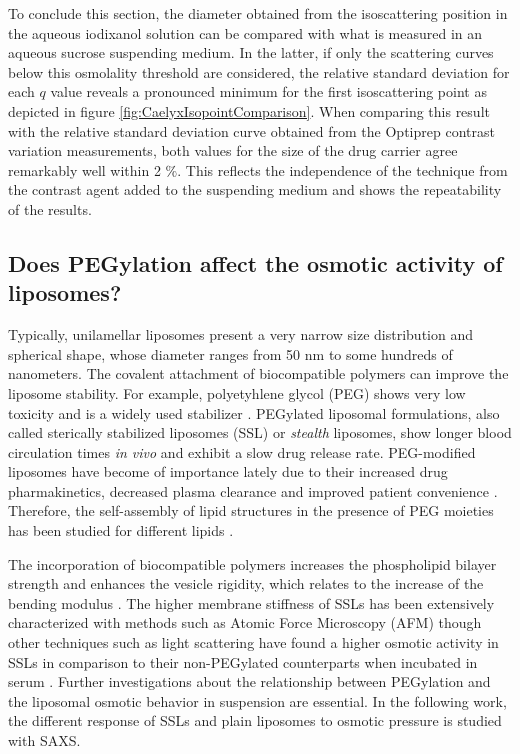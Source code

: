To conclude this section, the diameter obtained from the isoscattering position in the aqueous iodixanol solution can be compared with what is measured in an aqueous sucrose suspending medium. In the latter, if only the scattering curves below this osmolality threshold are considered, the relative standard deviation for each $q$ value reveals a pronounced minimum for the first isoscattering point as depicted in figure \ref{fig:CaelyxIsopointComparison}. When comparing this result with the relative standard deviation curve obtained from the Optiprep \textregistered contrast variation measurements, both values for the size of the drug carrier agree remarkably well within 2 $\%$. This reflects the independence of the technique from the contrast agent added to the suspending medium and shows the repeatability of the results.


\subsection{Does PEGylation affect the osmotic activity of liposomes?}
\label{sec:liposome_osmotic}

Typically, unilamellar liposomes present a very narrow size distribution and spherical shape, whose diameter ranges from 50 nm to some hundreds of nanometers. The covalent attachment of biocompatible polymers can improve the liposome stability. For example, polyetyhlene glycol (PEG) shows very low toxicity \citep{yamaoka_distribution_1994} and is a widely used stabilizer \citep{sou_polyethylene_2000}. PEGylated liposomal formulations, also called sterically stabilized liposomes (SSL) or \emph{stealth} liposomes, show longer blood circulation times \emph{in vivo} \citep{barenholz_liposome_2001} and exhibit a slow drug release rate. PEG-modified liposomes have become of importance lately due to their increased drug pharmakinetics, decreased plasma clearance and improved patient convenience \citep{gabizon_polyethylene_1997,harris_effect_2003}. Therefore, the self-assembly of lipid structures in the presence of PEG moieties has been studied for different lipids \citep{lee_coarse-grained_2011}.

The incorporation of biocompatible polymers increases the phospholipid bilayer strength and enhances the vesicle rigidity, which relates to the increase of the bending modulus \citep{liang_effect_2005, sou_polyethylene_2000}. The higher membrane stiffness of SSLs has been extensively characterized with methods such as Atomic Force Microscopy (AFM) \citep{spyratou_atomic_2009} though other techniques such as light scattering have found a higher osmotic activity in SSLs in comparison to their non-PEGylated counterparts when incubated in serum \citep{wolfram_shrinkage_2014}. Further investigations about the relationship between PEGylation and the liposomal osmotic behavior in suspension are essential. In the following work, the different response of SSLs and plain liposomes to osmotic pressure is studied with SAXS. 

